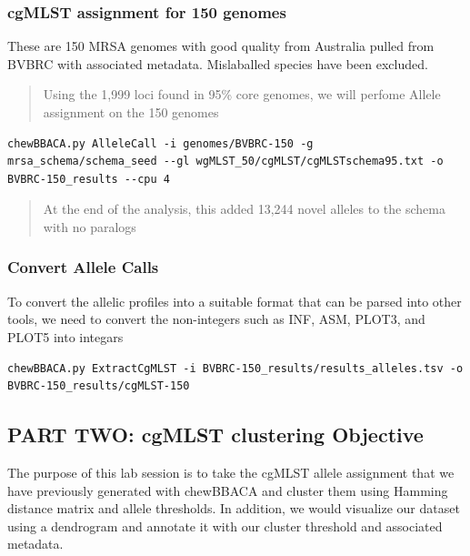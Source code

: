 \documentclass[
]{book}
\begin{document}
\subsubsection{cgMLST assignment for 150 genomes}\label{cgmlst-assignment-for-150-genomes}

These are 150 MRSA genomes with good quality from Australia pulled from BVBRC with associated metadata. Mislaballed species have been excluded.

\begin{quote}
Using the 1,999 loci found in 95\% core genomes, we will perfome Allele assignment on the 150 genomes
\end{quote}

\begin{verbatim}
chewBBACA.py AlleleCall -i genomes/BVBRC-150 -g mrsa_schema/schema_seed --gl wgMLST_50/cgMLST/cgMLSTschema95.txt -o BVBRC-150_results --cpu 4
\end{verbatim}

\begin{quote}
At the end of the analysis, this added 13,244 novel alleles to the schema with no paralogs
\end{quote}

\subsubsection{Convert Allele Calls}\label{convert-allele-calls}

To convert the allelic profiles into a suitable format that can be parsed into other tools, we need to convert the non-integers such as INF, ASM, PLOT3, and PLOT5 into integars

\begin{verbatim}
chewBBACA.py ExtractCgMLST -i BVBRC-150_results/results_alleles.tsv -o BVBRC-150_results/cgMLST-150
\end{verbatim}

\subsection{PART TWO: cgMLST clustering Objective}\label{part-two-cgmlst-clustering-objective}

The purpose of this lab session is to take the cgMLST allele assignment that we have previously generated with chewBBACA and cluster them using Hamming distance matrix and allele thresholds. In addition, we would visualize our dataset using a dendrogram and annotate it with our cluster threshold and associated metadata.
\end{document}
